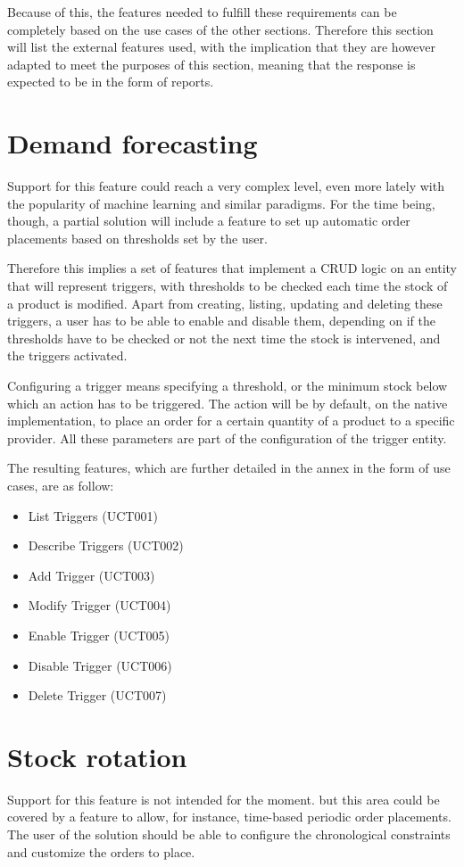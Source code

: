 Because of this, the features needed to fulfill these requirements can be completely based on the use cases of the other sections. Therefore this section will list the external features used, with the implication that they are however adapted to meet the purposes of this section, meaning that the response is expected to be in the form of reports.

\section{Demand forecasting}
Support for this feature could reach a very complex level, even more lately with the popularity of machine learning and similar paradigms. For the time being, though, a partial solution will include a feature to set up automatic order placements based on thresholds set by the user.

Therefore this implies a set of features that implement a CRUD logic on an entity that will represent triggers, with thresholds to be checked each time the stock of a product is modified. Apart from creating, listing, updating and deleting these triggers, a user has to be able to enable and disable them, depending on if the thresholds have to be checked or not the next time the stock is intervened, and the triggers activated.

Configuring a trigger means specifying a threshold, or the minimum stock below which an action has to be triggered. The action will be by default, on the native implementation, to place an order for a certain quantity of a product to a specific provider. All these parameters are part of the configuration of the trigger entity.

The resulting features, which are further detailed in the annex in the form of use cases, are as follow:

\begin{itemize}
\item List Triggers (UCT001)
\item Describe Triggers (UCT002)
\item Add Trigger (UCT003)
\item Modify Trigger (UCT004)
\item Enable Trigger (UCT005)
\item Disable Trigger (UCT006)
\item Delete Trigger (UCT007)
\end{itemize}

\section{Stock rotation}
Support for this feature is not intended for the moment. but this area could be covered by a feature to allow, for instance, time-based periodic order placements. The user of the solution should be able to configure the chronological constraints and customize the orders to place.

